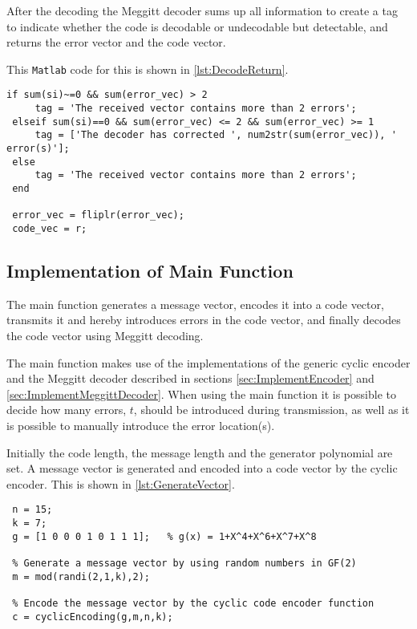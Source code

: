 \documentclass[Main]{subfiles}
\begin{document}
After the decoding the Meggitt decoder sums up all information to create a tag to indicate whether the code is decodable or undecodable but detectable, and returns the error vector and the code vector.

This \texttt{Matlab} code for this is shown in \codeTitle \ref{lst:DecodeReturn}.

\begin{lstlisting}[caption=Meggitt Decoder's Return, style=Code-Matlab, label=lst:DecodeReturn]
 if sum(si)~=0 && sum(error_vec) > 2
     tag = 'The received vector contains more than 2 errors';
 elseif sum(si)==0 && sum(error_vec) <= 2 && sum(error_vec) >= 1
     tag = ['The decoder has corrected ', num2str(sum(error_vec)), ' error(s)'];
 else
     tag = 'The received vector contains more than 2 errors';
 end
 
 error_vec = fliplr(error_vec);
 code_vec = r;
\end{lstlisting}








\subsection{Implementation of Main Function}
The main function generates a message vector, encodes it into a code vector, transmits it and hereby introduces errors in the code vector, and finally decodes the code vector using Meggitt decoding.

The main function makes use of the implementations of the generic cyclic encoder and the Meggitt decoder described in sections \ref{sec:ImplementEncoder} and \ref{sec:ImplementMeggittDecoder}. 
When using the main function it is possible to decide how many errors, $t$, should be introduced during transmission, as well as it is possible to manually introduce the error location(s).

Initially the code length, the message length and the generator polynomial are set. 
A message vector is generated and encoded into a code vector by the cyclic encoder. 
This is shown in \codeTitle \ref{lst:GenerateVector}. 

\begin{lstlisting}[caption=Generating and Encoding a Vector, style=Code-Matlab, label=lst:GenerateVector]
 % Set the code length, message length and the generator polynomial
 n = 15;
 k = 7;
 g = [1 0 0 0 1 0 1 1 1];   % g(x) = 1+X^4+X^6+X^7+X^8

 % Generate a message vector by using random numbers in GF(2)
 m = mod(randi(2,1,k),2);

 % Encode the message vector by the cyclic code encoder function
 c = cyclicEncoding(g,m,n,k);
\end{lstlisting}
\end{document}
